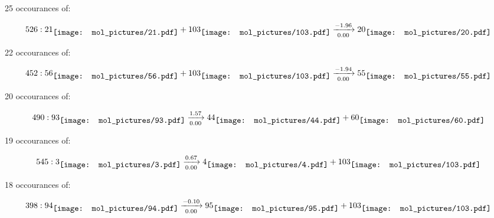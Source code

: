 \documentclass{article}
\begin{document}
\vspace{1cm}


25 occourances of:

$$
526:  
21
\raisebox{-.5\height}{\texttt{[image: mol\_pictures/21.pdf]}}
+
103
\raisebox{-.5\height}{\texttt{[image: mol\_pictures/103.pdf]}}
\xrightarrow[0.00]{-1.96}
20
\raisebox{-.5\height}{\texttt{[image: mol\_pictures/20.pdf]}}
$$



\vspace{1cm}


22 occourances of:

$$
452:  
56
\raisebox{-.5\height}{\texttt{[image: mol\_pictures/56.pdf]}}
+
103
\raisebox{-.5\height}{\texttt{[image: mol\_pictures/103.pdf]}}
\xrightarrow[0.00]{-1.94}
55
\raisebox{-.5\height}{\texttt{[image: mol\_pictures/55.pdf]}}
$$



\vspace{1cm}


20 occourances of:

$$
490:  
93
\raisebox{-.5\height}{\texttt{[image: mol\_pictures/93.pdf]}}
\xrightarrow[0.00]{1.57}
44
\raisebox{-.5\height}{\texttt{[image: mol\_pictures/44.pdf]}}
+
60
\raisebox{-.5\height}{\texttt{[image: mol\_pictures/60.pdf]}}
$$



\vspace{1cm}


19 occourances of:

$$
545:  
3
\raisebox{-.5\height}{\texttt{[image: mol\_pictures/3.pdf]}}
\xrightarrow[0.00]{0.67}
4
\raisebox{-.5\height}{\texttt{[image: mol\_pictures/4.pdf]}}
+
103
\raisebox{-.5\height}{\texttt{[image: mol\_pictures/103.pdf]}}
$$



\vspace{1cm}


18 occourances of:

$$
398:  
94
\raisebox{-.5\height}{\texttt{[image: mol\_pictures/94.pdf]}}
\xrightarrow[0.00]{-0.10}
95
\raisebox{-.5\height}{\texttt{[image: mol\_pictures/95.pdf]}}
+
103
\raisebox{-.5\height}{\texttt{[image: mol\_pictures/103.pdf]}}
$$



\vspace{1cm}
\end{document}
